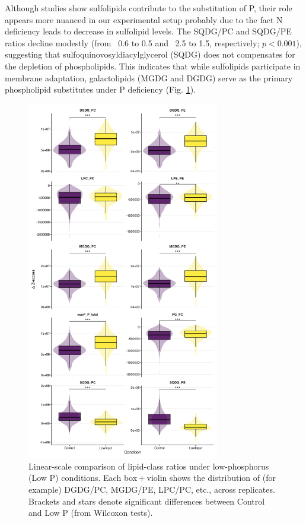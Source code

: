 \documentclass[10pt,letterpaper]{article}
\begin{document}
Although studies show sulfolipids contribute to the substitution of P, their role appears more nuanced in our experimental setup probably due to the fact N deficiency leads to decrease in sulfolipid levels. The SQDG/PC and SQDG/PE ratios decline modestly (from ~0.6 to 0.5 and ~2.5 to 1.5, respectively; $p < 0.001$), suggesting that sulfoquinovosyldiacylglycerol (SQDG) does not compensates for the depletion of phospholipids. This indicates that while sulfolipids participate in membrane adaptation, galactolipids (MGDG and DGDG) serve as the primary phospholipid substitutes under P deficiency (Fig. \ref{fig:2a_ratio_lowP}).

\begin{figure}[htbp]
  \centering
  \includegraphics[width=0.75\textwidth]{fig/main/Fig2a_lipid_ratio_linear_lowP.png}
  \caption{Linear-scale comparison of lipid-class ratios under low-phosphorus (Low P) conditions. Each box + violin shows the distribution of (for example) DGDG/PC, MGDG/PE, LPC/PC, etc., across replicates.  Brackets and stars denote significant differences between Control and Low P (from Wilcoxon tests).}
  \label{fig:2a_ratio_lowP}
\end{figure}
\end{document}
